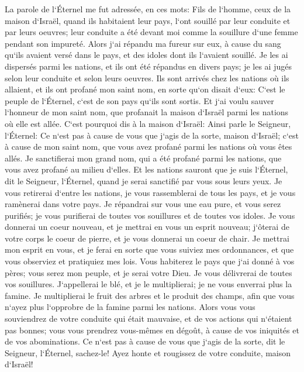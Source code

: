 \verse La parole de l`Éternel me fut adressée, en ces mots: 
\verse Fils de l`homme, ceux de la maison d`Israël, quand ils habitaient leur pays, l`ont souillé par leur conduite et par leurs oeuvres; leur conduite a été devant moi comme la souillure d`une femme pendant son impureté. 
\verse Alors j`ai répandu ma fureur sur eux, à cause du sang qu`ils avaient versé dans le pays, et des idoles dont ils l`avaient souillé. 
\verse Je les ai dispersés parmi les nations, et ils ont été répandus en divers pays; je les ai jugés selon leur conduite et selon leurs oeuvres. 
\verse Ils sont arrivés chez les nations où ils allaient, et ils ont profané mon saint nom, en sorte qu`on disait d`eux: C`est le peuple de l`Éternel, c`est de son pays qu`ils sont sortis. 
\verse Et j`ai voulu sauver l`honneur de mon saint nom, que profanait la maison d`Israël parmi les nations où elle est allée. 
\verse C`est pourquoi dis à la maison d`Israël: Ainsi parle le Seigneur, l`Éternel: Ce n`est pas à cause de vous que j`agis de la sorte, maison d`Israël; c`est à cause de mon saint nom, que vous avez profané parmi les nations où vous êtes allés. 
\verse Je sanctifierai mon grand nom, qui a été profané parmi les nations, que vous avez profané au milieu d`elles. Et les nations sauront que je suis l`Éternel, dit le Seigneur, l`Éternel, quand je serai sanctifié par vous sous leurs yeux. 
\verse Je vous retirerai d`entre les nations, je vous rassemblerai de tous les pays, et je vous ramènerai dans votre pays. 
\verse Je répandrai sur vous une eau pure, et vous serez purifiés; je vous purifierai de toutes vos souillures et de toutes vos idoles. 
\verse Je vous donnerai un coeur nouveau, et je mettrai en vous un esprit nouveau; j`ôterai de votre corps le coeur de pierre, et je vous donnerai un coeur de chair. 
\verse Je mettrai mon esprit en vous, et je ferai en sorte que vous suiviez mes ordonnances, et que vous observiez et pratiquiez mes lois. 
\verse Vous habiterez le pays que j`ai donné à vos pères; vous serez mon peuple, et je serai votre Dieu. 
\verse Je vous délivrerai de toutes vos souillures. J`appellerai le blé, et je le multiplierai; je ne vous enverrai plus la famine. 
\verse Je multiplierai le fruit des arbres et le produit des champs, afin que vous n`ayez plus l`opprobre de la famine parmi les nations. 
\verse Alors vous vous souviendrez de votre conduite qui était mauvaise, et de vos actions qui n`étaient pas bonnes; vous vous prendrez vous-mêmes en dégoût, à cause de vos iniquités et de vos abominations. 
\verse Ce n`est pas à cause de vous que j`agis de la sorte, dit le Seigneur, l`Éternel, sachez-le! Ayez honte et rougissez de votre conduite, maison d`Israël! 
